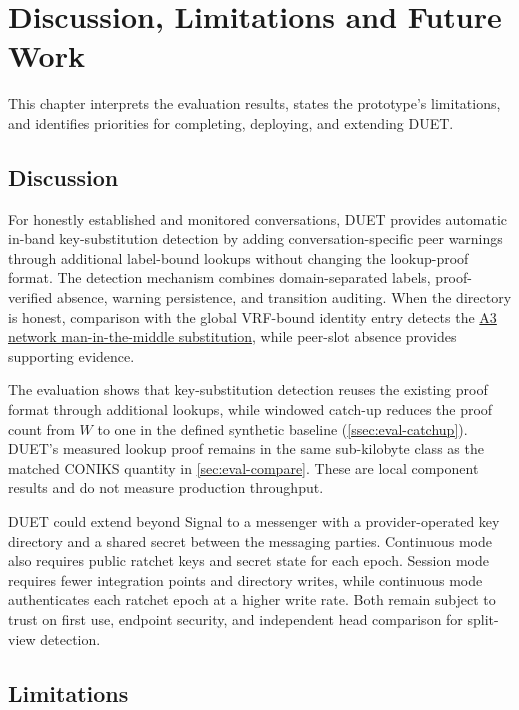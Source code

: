 \chapter{Discussion, Limitations and Future Work}\label{ch:discussion}

This chapter interprets the evaluation results, states the prototype's limitations, and identifies
priorities for completing, deploying, and extending DUET.

\section{Discussion}\label{sec:disc-discussion}

For honestly established and monitored conversations, DUET provides automatic in-band
key-substitution detection by adding conversation-specific peer warnings through additional
label-bound lookups without changing the lookup-proof format. The
detection mechanism combines domain-separated labels, proof-verified absence, warning persistence,
and transition auditing. When the directory is honest, comparison with the global VRF-bound identity
entry detects the \hyperref[sc:threat-a3]{A3 network man-in-the-middle substitution}, while
peer-slot absence provides supporting evidence.

The evaluation shows that key-substitution detection reuses the existing proof format through
additional lookups, while windowed catch-up reduces the proof count from $W$ to one in the defined
synthetic baseline (\cref{ssec:eval-catchup}). DUET's measured lookup proof remains in the same
sub-kilobyte class as the matched CONIKS quantity in \cref{sec:eval-compare}. These are local
component results and do not measure production throughput.

DUET could extend beyond Signal to a messenger with a provider-operated key directory and a shared
secret between the messaging parties. Continuous mode also requires public ratchet keys and secret
state for each epoch. Session mode requires fewer integration points and directory writes, while
continuous mode authenticates each ratchet epoch at a higher write rate. Both remain subject to
trust on first use, endpoint security, and independent head comparison for split-view detection.

\section{Limitations}\label{sec:disc-limitations}

